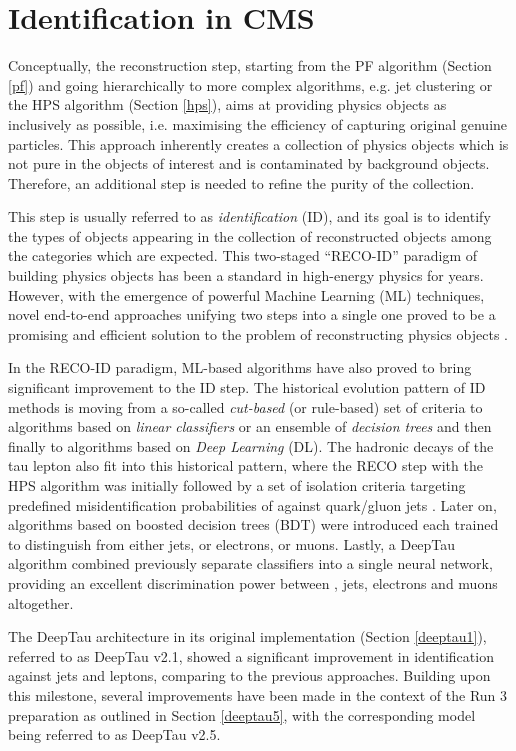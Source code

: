\section{Identification in CMS}
Conceptually, the reconstruction step, starting from the PF algorithm (Section \ref{pf}) and going hierarchically to more complex algorithms, e.g. jet clustering or the HPS algorithm (Section \ref{hps}), aims at providing physics objects as inclusively as possible, i.e. maximising the efficiency of capturing original genuine particles. This approach inherently creates a collection of physics objects which is not pure in the objects of interest and is contaminated by background objects. Therefore, an additional step is needed to refine the purity of the collection. 

This step is usually referred to as \textit{identification} (ID), and its goal is to identify the types of objects appearing in the collection of reconstructed objects among the categories which are expected. This two-staged \enquote{RECO-ID} paradigm of building physics objects has been a standard in high-energy physics for years. However, with the emergence of powerful Machine Learning (ML) techniques, novel end-to-end approaches unifying two steps into a single one proved to be a promising and efficient solution to the problem of reconstructing physics objects \cite{CMS:2022wjj,Pata:2021oez}. 

In the RECO-ID paradigm, ML-based algorithms have also proved to bring significant improvement to the ID step. The historical evolution pattern of ID methods is moving from a so-called \textit{cut-based} (or rule-based) set of criteria to algorithms based on \textit{linear classifiers} or an ensemble of \textit{decision trees} and then finally to algorithms based on \textit{Deep Learning} (DL). The hadronic decays of the tau lepton also fit into this historical pattern, where the RECO step with the HPS algorithm was initially followed by a set of isolation criteria targeting predefined misidentification probabilities of \tauh against quark/gluon jets \cite{cms2012performance}. Later on, algorithms based on boosted decision trees (BDT) were introduced \cite{CMS:2015pac, CMS:2018jrd} each trained to distinguish \tauh from either jets, or electrons, or muons. Lastly, a DeepTau algorithm \cite{CMS:2022prd} combined previously separate classifiers into a single neural network, providing an excellent discrimination power between \tauh, jets, electrons and muons altogether. 

The DeepTau architecture in its original implementation (Section \ref{deeptau1}), referred to as DeepTau v2.1, showed a significant improvement in \tauh identification against jets and leptons, comparing to the previous approaches. Building upon this milestone, several improvements have been made in the context of the Run 3 preparation as outlined in Section \ref{deeptau5}, with the corresponding model being referred to as DeepTau v2.5. 

